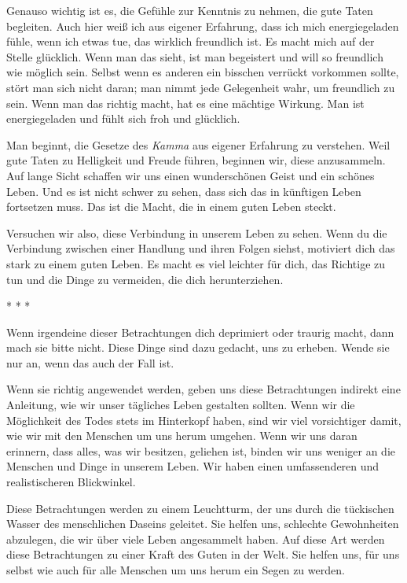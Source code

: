 \documentclass[12pt,openany]{book}
\begin{document}
Genauso wichtig ist es, die Gefühle zur Kenntnis zu nehmen, die gute Taten begleiten. Auch hier weiß ich aus eigener Erfahrung, dass ich mich energiegeladen fühle, wenn ich etwas tue, das wirklich freundlich ist. Es macht mich auf der Stelle glücklich. Wenn man das sieht, ist man begeistert und will so freundlich wie möglich sein. Selbst wenn es anderen ein bisschen verrückt vorkommen sollte, stört man sich nicht daran; man nimmt jede Gelegenheit wahr, um freundlich zu sein. Wenn man das richtig macht, hat es eine mächtige Wirkung. Man ist energiegeladen und fühlt sich froh und glücklich.

Man beginnt, die Gesetze des \textit{Kamma} aus eigener Erfahrung zu verstehen. Weil gute Taten zu Helligkeit und Freude führen, beginnen wir, diese anzusammeln. Auf lange Sicht schaffen wir uns einen wunderschönen Geist und ein schönes Leben. Und es ist nicht schwer zu sehen, dass sich das in künftigen Leben fortsetzen muss. Das ist die Macht, die in einem guten Leben steckt.

Versuchen wir also, diese Verbindung in unserem Leben zu sehen. Wenn du die Verbindung zwischen einer Handlung und ihren Folgen siehst, motiviert dich das stark zu einem guten Leben. Es macht es viel leichter für dich, das Richtige zu tun und die Dinge zu vermeiden, die dich he\-runterziehen.

\begin{center}
* * *
\end{center}

Wenn irgendeine dieser Betrachtungen dich deprimiert oder traurig macht, dann mach sie bitte nicht. Diese Dinge sind dazu gedacht, uns zu erheben. Wende sie nur an, wenn das auch der Fall ist.

Wenn sie richtig angewendet werden, geben uns diese Betrachtungen indirekt eine Anleitung, wie wir unser tägliches Leben gestalten sollten. Wenn wir die Möglichkeit des Todes stets im Hinterkopf haben, sind wir viel vorsichtiger damit, wie wir mit den Menschen um uns herum umgehen. Wenn wir uns daran erinnern, dass alles, was wir besitzen, geliehen ist, binden wir uns weniger an die Menschen und Dinge in unserem Leben. Wir haben einen umfassenderen und realistischeren Blickwinkel.

Diese Betrachtungen werden zu einem Leuchtturm, der uns durch die tückischen Wasser des menschlichen Daseins geleitet. Sie helfen uns, schlechte Gewohnheiten abzulegen, die wir über viele Leben angesammelt haben. Auf diese Art werden diese Betrachtungen zu einer Kraft des Guten in der Welt. Sie helfen uns, für uns selbst wie auch für alle Menschen um uns herum ein Segen zu werden.
\end{document}
